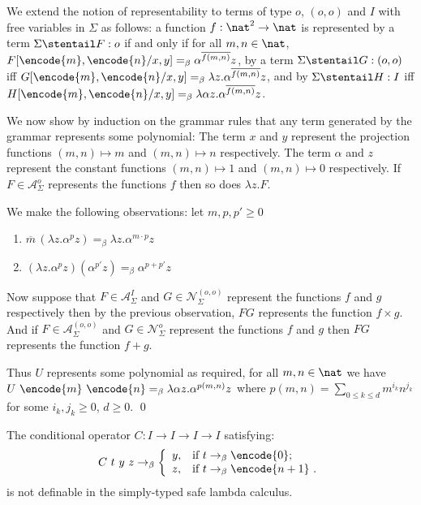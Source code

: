 We extend the notion of representability to terms of type $o$,
$(o,o)$ and $I$ with free variables in $\Sigma$ as follows: a
function $f:\nat^2 \rightarrow \nat$ is represented by a term
$\Sigma \stentail F:o$ if and only if for all $m,n\in\nat$,
$F[\encode{m}, \encode{n}/x,y] =_\beta \alpha^{\overline{f(m,n)}}
z$, by a term $\Sigma \stentail G:(o,o)$ iff $G[\encode{m},
\encode{n}/x,y] =_\beta \lambda z . \alpha^{\overline{f(m,n)}} z$,
and by $\Sigma \stentail H:I$ iff $H[\encode{m}, \encode{n}/x,y]
=_\beta \lambda \alpha z . \alpha^{\overline{f(m,n)}} z$.

We now show by induction on the grammar rules that any term
generated by the grammar represents some polynomial: The term $x$
and $y$ represent the projection functions $(m,n)\mapsto m$ and
$(m,n)\mapsto n$ respectively. The term $\alpha$ and $z$ represent
the constant functions $(m,n)\mapsto 1$ and $(m,n)\mapsto 0$
respectively. If $F\in \mathcal{A}^o_\Sigma$ represents the
functions $f$ then so does $\lambda z. F$.

We make the following observations: let $m, p, p' \geq 0$
\begin{enumerate}
\item ${\overline m} \, (\lambda z.\alpha^p z) =_\beta \lambda z . \alpha^{m \cdot p} z$
\item $(\lambda z.\alpha^p z) (\alpha^{p'} z) =_\beta \alpha^{p + p'} z$
\end{enumerate}

Now suppose that $F\in \mathcal{A}^I_\Sigma$ and $G\in
\mathcal{N}^{(o,o)}_\Sigma$ represent the functions $f$ and $g$
respectively then by the previous observation, $F G$ represents the
function $f \times g$. And if $F\in \mathcal{A}^{(o,o)}_\Sigma$ and
$G\in \mathcal{N}^o_\Sigma$ represent the functions $f$ and $g$ then
$F G$ represents the function $f+g$.

Thus $U$ represents some polynomial as required, \ie for all $m,n\in
\nat$ we have $U~\encode{m}~\encode{n} =_\beta \lambda \alpha z .
\alpha^{p(m,n)} z$ where $p(m,n) = \sum_{0\leq k \leq d} m^{i_k}
n^{j_k}$ for some $i_k,j_k \geq 0$, $d\geq 0$. \qed
%


\begin{corollary}
The conditional operator $C:I\rightarrow I\rightarrow I \rightarrow
I$ satisfying:
$$
C~t~y~z \rightarrow_\beta \left\{
                            \begin{array}{ll}
                              y, & \hbox{if $t
\rightarrow_\beta \encode{0}$;} \\
                              z, & \hbox{if
$t \rightarrow_\beta \encode{n+1}$ .}
                            \end{array}
                          \right.
$$
is not definable in the simply-typed safe lambda calculus.
\end{corollary}


